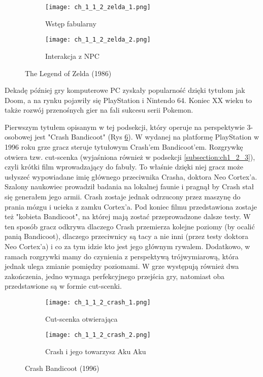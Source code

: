 \begin{figure}[h]
	\begin{subfigure}{0.49\textwidth}
		\caption{Wstęp fabularny}
		\texttt{[image: ch\_1\_1\_2\_zelda\_1.png]}
		\label{subfig:ch_1_1_2_zelda_1}
	\end{subfigure}
	\begin{subfigure}{0.49\textwidth}
		\caption{Interakcja z NPC}
		\texttt{[image: ch\_1\_1\_2\_zelda\_2.png]}
		\label{subfig:ch_1_1_2_zelda_2}
	\end{subfigure}
	\caption{The Legend of Zelda (1986)}
	\label{fig:ch1_1_2_zelda}
\end{figure}

Dekadę później gry komputerowe PC zyskały popularność dzięki tytułom jak Doom, a na rynku
pojawiły się PlayStation i Nintendo 64. Koniec XX wieku to także rozwój przenośnych gier na
fali sukcesu serii Pokemon.

Pierwszym tytułem opisanym w tej podsekcji, który operuje na perspektywie 3-osobowej jest
"Crash Bandicoot" (Rys \ref{fig:ch1_1_2_crash}). W wydanej na platformę PlayStation w 1996 roku grze
gracz steruje tytułowym Crash'em Bandicoot'em. Rozgrywkę otwiera tzw. cut-scenka (wyjaśniona również w
podsekcji \ref{subsection:ch1_2_3}), czyli krótki film wprowadzający do fabuły. To właśnie dzięki niej
gracz może usłyszeć wypowiadane imię głównego przeciwnika Crasha, doktora Neo Cortex'a.
Szalony naukowiec prowadził badania na lokalnej faunie i pragnął by Crash
stał się generałem jego armii. Crash zostaje jednak odrzucony przez maszynę do prania mózgu i ucieka
z zamku Cortex'a. Pod koniec filmu przedstawiona zostaje też "kobieta Bandicoot", na której mają zostać
przeprowadzone dalsze testy. W ten sposób gracz odkrywa dlaczego Crash przemierza kolejne poziomy (by ocalić
panią Bandicoot), dlaczego przeciwnicy są tacy a nie inni (przez testy doktora Neo Cortex'a) i co za tym
idzie kto jest jego głównym rywalem. Dodatkowo, w ramach rozgrywki mamy do czynienia z perspektywą
trójwymiarową, która jednak ulega zmianie pomiędzy poziomami. W grze występują również dwa zakończenia,
jedno wymaga perfekcyjnego przejścia gry, natomiast oba przedstawione są w formie cut-scenki.

\begin{figure}[h]
	\begin{subfigure}{0.49\textwidth}
		\caption{Cut-scenka otwierająca}
		\texttt{[image: ch\_1\_1\_2\_crash\_1.png]}
		\label{subfig:ch_1_1_2_crash_1}
	\end{subfigure}
	\begin{subfigure}{0.49\textwidth}
		\caption{Crash i jego towarzysz Aku Aku}
		\texttt{[image: ch\_1\_1\_2\_crash\_2.png]}
		\label{subfig:ch_1_1_2_crash_2}
	\end{subfigure}
	\caption{Crash Bandicoot (1996)}
	\label{fig:ch1_1_2_crash}
\end{figure}

